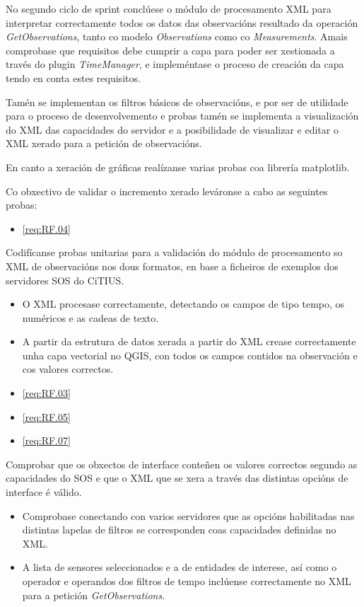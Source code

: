 No segundo ciclo de sprint conclúese o módulo de procesamento XML para interpretar correctamente todos os datos das observacións resultado da operación \emph{GetObservations}, tanto co modelo \emph{Observations} como co \emph{Measurements}. Amais comprobase que requisitos debe cumprir a capa para poder ser xestionada a través do plugin \emph{TimeManager}, e impleméntase o proceso de creación da capa tendo en conta estes requisitos.

Tamén se implementan os filtros básicos de observacións, e por ser de utilidade para o proceso de desenvolvemento e probas tamén se implementa a visualización do XML das capacidades do servidor e a posibilidade de visualizar e editar o XML xerado para a petición de observacións.

En canto a xeración de gráficas realízanse varias probas coa librería matplotlib.

Co obxectivo de validar o incremento xerado leváronse a cabo as seguintes probas:

		  {\begin{itemize}\item \ref{req:RF.04} \\\end{itemize}} %
		  {Codifícanse probas unitarias para a validación do módulo de procesamento so XML de observacións nos dous formatos, en base a ficheiros de exemplos dos servidores SOS do CiTIUS.} %
		  {\begin{itemize}
		  \item O XML procesase correctamente, detectando os campos de tipo tempo, os numéricos e as cadeas de texto.
		  \item A partir da estrutura de datos xerada a partir do XML crease correctamente unha capa vectorial no QGIS, con todos os campos contidos na observación e cos valores correctos.
		  \end{itemize}} %

		  {\begin{itemize}\item \ref{req:RF.03} \item \ref{req:RF.05} \item \ref{req:RF.07}\end{itemize}} %
		  {Comprobar que os obxectos de interface conteñen os valores correctos segundo as capacidades do SOS e que o XML que se xera a través das distintas opcións de interface é válido.} %
		  {\begin{itemize}
		  \item Comprobase conectando con varios servidores que as opcións habilitadas nas distintas lapelas de filtros se corresponden coas capacidades definidas no XML.
		  \item A lista de sensores seleccionados e a de entidades de interese, así como o operador e operandos dos filtros de tempo inclúense correctamente no XML para a petición \emph{GetObservations}.
		  \end{itemize}} %

